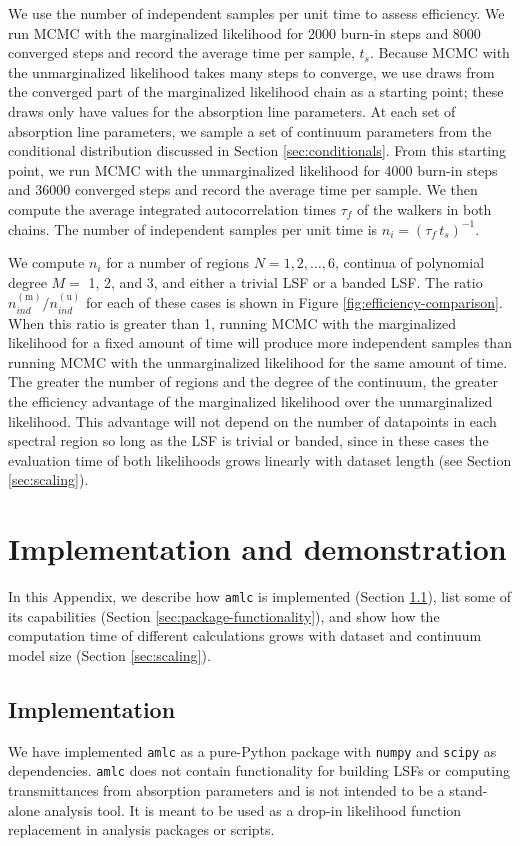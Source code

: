 \documentclass[trackchanges]{aastex62}
\newcommand{\pkgname}{\texttt{amlc}}
\begin{document}
{We use the number of independent samples per unit time to assess efficiency.
We run MCMC with the marginalized likelihood for 2000 burn-in steps and 8000 converged steps and record the average time per sample, $t_s$.
Because MCMC with the unmarginalized likelihood takes many steps to converge, we use draws from the converged part of the marginalized likelihood chain as a starting point; these draws only have values for the absorption line parameters.
At each set of absorption line parameters, we sample a set of continuum parameters from the conditional distribution discussed in Section \ref{sec:conditionals}.
From this starting point, we run MCMC with the unmarginalized likelihood for 4000 burn-in steps and 36000 converged steps and record the average time per sample.
We then compute the average integrated autocorrelation times $\tau_f$ of the walkers in both chains.
The number of independent samples per unit time is $n_i = \left(\tau_f \, t_s \right)^{-1}$.

We compute $n_i$ for a number of regions $N = 1, 2, \ldots, 6$, continua of polynomial degree $M=$ 1, 2, and 3, and either a trivial LSF or a banded LSF.
The ratio $n_{ind}^{(\text{m})} / n_{ind}^{(\text{u})}$ for each of these cases is shown in Figure \ref{fig:efficiency-comparison}.
When this ratio is greater than 1, running MCMC with the marginalized likelihood for a fixed amount of time will produce more independent samples than running MCMC with the unmarginalized likelihood for the same amount of time.
The greater the number of regions and the degree of the continuum, the greater the efficiency advantage of the marginalized likelihood over the unmarginalized likelihood.
This advantage will not depend on the number of datapoints in each spectral region so long as the LSF is trivial or banded, since in these cases the evaluation time of both likelihoods grows linearly with dataset length (see Section \ref{sec:scaling}).
}

\section{Implementation and demonstration}
\label{sec:package-and-demos}
In this Appendix, we describe how \pkgname{} is implemented (Section \ref{sec:implementation}), list some of its capabilities (Section \ref{sec:package-functionality}), and show how the computation time of different calculations grows with dataset and continuum model size (Section \ref{sec:scaling}).

\subsection{Implementation}
\label{sec:implementation}
We have implemented \pkgname{} as a pure-Python package with \texttt{numpy} and \texttt{scipy} as dependencies.
\pkgname{} does not contain functionality for building LSFs or computing transmittances from absorption parameters and is not intended to be a stand-alone analysis tool.
It is meant to be used as a drop-in likelihood function replacement in analysis packages or scripts.
\end{document}
